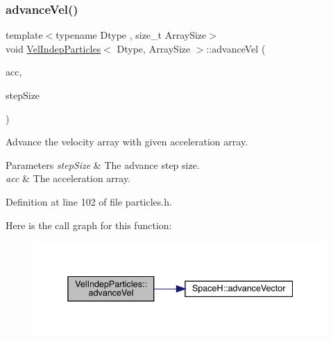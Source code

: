 \subsubsection{\texorpdfstring{advance\+Vel()}{advanceVel()}}
{\footnotesize\ttfamily template$<$typename Dtype , size\+\_\+t Array\+Size$>$ \\
void \mbox{\hyperlink{class_vel_indep_particles}{Vel\+Indep\+Particles}}$<$ Dtype, Array\+Size $>$\+::advance\+Vel (\begin{DoxyParamCaption}\item[{const \mbox{\hyperlink{class_vel_indep_particles_a27580f65b6523bfb6900520af2e44708}{Vector\+Array}} \&}]{acc,  }\item[{\mbox{\hyperlink{class_vel_indep_particles_a5d275b22f0d759f360ddd80e78f4b466}{Scalar}}}]{step\+Size }\end{DoxyParamCaption})\hspace{0.3cm}{\ttfamily [inline]}}



Advance the velocity array with given acceleration array. 


\begin{DoxyParams}{Parameters}
{\em step\+Size} & The advance step size. \\
\hline
{\em acc} & The acceleration array. \\
\hline
\end{DoxyParams}


Definition at line 102 of file particles.\+h.

Here is the call graph for this function\+:\nopagebreak
\begin{figure}[H]
\begin{center}
\leavevmode
\includegraphics[width=338pt]{class_vel_indep_particles_adb74d0445c84c0b705c25a8c50f6bc00_cgraph}
\end{center}
\end{figure}
\mbox{\label{class_vel_indep_particles_a5b43130b3d3a94f5e2336e4e0ca78cf4}} 
